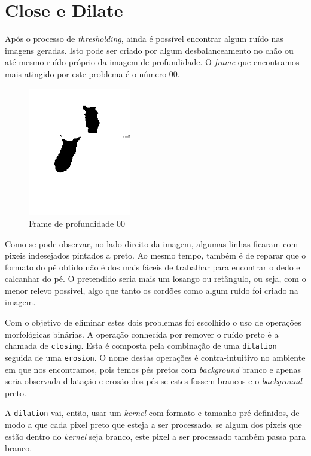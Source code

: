 \documentclass[a4paper]{report}
\begin{document}
\section{Close e Dilate}
Após o processo de \textit{thresholding}, ainda é possível encontrar algum ruído nas imagens geradas.
Isto pode ser criado por algum desbalanceamento no chão ou até mesmo ruído próprio da imagem de
profundidade. O \textit{frame} que encontramos mais atingido por este problema é o número 00.

\begin{figure}[H]
    \centering
        \includegraphics[width=0.4\textwidth]{images/building/closeDilate/original00.png}
        \caption{Frame de profundidade 00}
        \label{img:frame00}
\end{figure}

Como se pode observar, no lado direito da imagem, algumas linhas ficaram com pixeis indesejados pintados
a preto. Ao mesmo tempo, também é de reparar que o formato do pé obtido não é dos mais fáceis de trabalhar
para encontrar o dedo e calcanhar do pé. O pretendido seria mais um losango ou retângulo, ou seja, com o
menor relevo possível, algo que tanto os cordões como algum ruído foi criado na imagem.

Com o objetivo de eliminar estes dois problemas foi escolhido o uso de operações morfológicas binárias. A
operação conhecida por remover o ruído preto é a chamada de \texttt{closing}. Esta é composta pela
combinação de uma \texttt{dilation} seguida de uma \texttt{erosion}. O nome destas operações é contra-intuitivo
no ambiente em que nos encontramos, pois temos pés pretos com \textit{background} branco e apenas seria
observada dilatação e erosão dos pés se estes fossem brancos e o \textit{background} preto. 

A \texttt{dilation} vai, então, usar um \textit{kernel} com formato e tamanho pré-definidos, de modo a
que cada pixel preto que esteja a ser processado, se algum dos pixeis que estão dentro do \textit{kernel}
seja branco, este pixel a ser processado também passa para branco.
\end{document}
